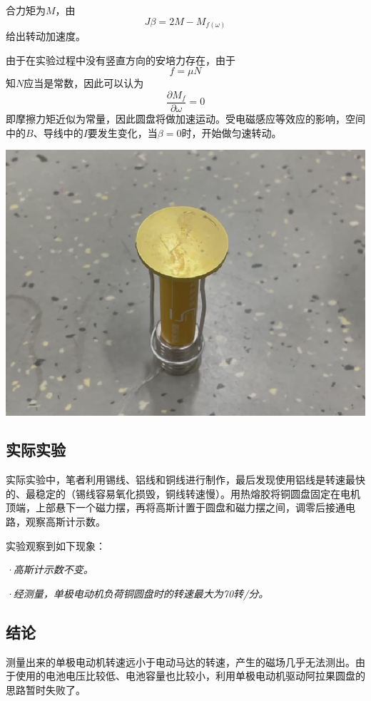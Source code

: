 \documentclass{CLGPY}
\begin{document}
\begin{multicols}{1}
合力矩为$M$，由
\begin{equation}
J\beta=2M-M_{f(\omega)}
\end{equation}
给出转动加速度。

由于在实验过程中没有竖直方向的安培力存在，由于
\begin{equation}
f=\mu N
\end{equation}
知$N$应当是常数，因此可以认为
\begin{equation}
\frac{\partial M_{f}}{\partial \omega}=0
\end{equation}
即摩擦力矩近似为常量，因此圆盘将做加速运动。受电磁感应等效应的影响，空间中的$B$、导线中的$I$要发生变化，当$\beta=0$时，开始做匀速转动。

        \begin{center}
            \includegraphics[scale=.15]{./fig/20210616212532.png}
        \end{center}
\subsection{实际实验}
实际实验中，笔者利用锡线、铝线和铜线进行制作，最后发现使用铝线是转速最快的、最稳定的（锡线容易氧化损毁，铜线转速慢）。用热熔胶将铜圆盘固定在电机顶端，上部悬下一个磁力摆，再将高斯计置于圆盘和磁力摆之间，调零后接通电路，观察高斯计示数。

实验观察到如下现象：

\emph{·高斯计示数不变。}

\emph{·经测量，单极电动机负荷铜圆盘时的转速最大为70转/分。}


\subsection{结论}
测量出来的单极电动机转速远小于电动马达的转速，产生的磁场几乎无法测出。由于使用的电池电压比较低、电池容量也比较小，利用单极电动机驱动阿拉果圆盘的思路暂时失败了。


\end{multicols}
\end{document}
